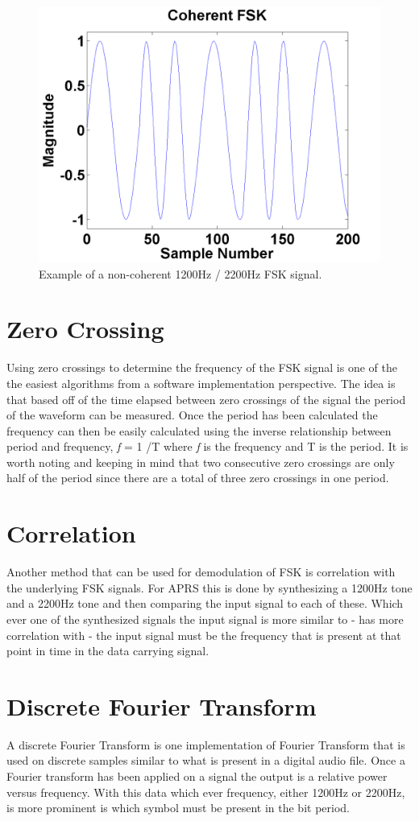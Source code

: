 \begin{figure}
  \centering
	\includegraphics[width=0.75\linewidth]{images/CoherentFSK.png} 
	\caption{Example of a non-coherent 1200Hz / 2200Hz FSK signal.}
   \label{coherentFSKExample}
\end{figure}

\section{Zero Crossing}
Using zero crossings to determine the frequency of the FSK signal is one of the the easiest algorithms from a software implementation perspective. The idea is that based off of the time elapsed between zero crossings of the signal the period of the waveform can be measured. Once the period has been calculated the frequency can then be easily calculated using the inverse relationship between period and frequency, \textit{f} = 1 /T where \textit{f} is the frequency and T is the period. It is worth noting and keeping in mind that two consecutive zero crossings are only half of the period since there are a total of three zero crossings in one period.

\section{Correlation}
Another method that can be used for demodulation of FSK is correlation with the underlying FSK signals. For APRS this is done by synthesizing a 1200Hz tone and a 2200Hz tone and then comparing the input signal to each of these. Which ever one of the synthesized signals the input signal is more similar to - has more correlation with - the input signal must be the frequency that is present at that point in time in the data carrying signal. 

\section{Discrete Fourier Transform}
A discrete Fourier Transform is one implementation of Fourier Transform that is used on discrete samples similar to what is present in a digital audio file. Once a Fourier transform has been applied on a signal the output is a relative power versus frequency. With this data which ever frequency, either 1200Hz or 2200Hz, is more prominent is which symbol must be present in the bit period. 

